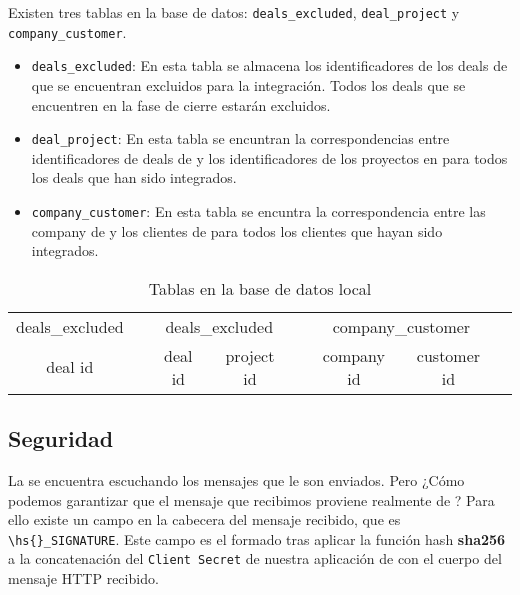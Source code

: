 \begin{itemize}[leftmargin=*]
 Existen tres tablas en la base de datos: \verb|deals_excluded|, \verb|deal_project| y \verb|company_customer|.
 
 
 \begin{itemize}
	\item \verb|deals_excluded|: En esta tabla se almacena los identificadores de los deals de \hs{} 
	que se encuentran excluidos para la integración. Todos los deals que se encuentren en la fase de
	cierre estarán excluidos.
	\item \verb|deal_project|: En esta tabla se encuntran la correspondencias entre identificadores 
	de deals de \hs{} y los identificadores de los proyectos en \wday{} para todos los deals que han sido integrados.
	\item \verb|company_customer|: En esta tabla se encuntra la correspondencia entre las company de \hs{} y los clientes de \wday{}
	para todos los clientes que hayan sido integrados.
 \end{itemize}
 
\begin{table}
		\centering
		\begin{tabular}{
		|c|c@{\hskip 1cm} 
		|c|c|c@{\hskip 1cm} 
		|c|c|c@{\hskip 1cm}
		}
		\cline{1-1}\cline{3-4}\cline{6-7}
		deals\_excluded && \multicolumn{2}{c|}{deals\_excluded} && \multicolumn{2}{c|}{company\_customer} \\
	\cline{1-1}\cline{3-4}\cline{6-7}
	deal id && deal id & project id && company id & customer id \\
	\cline{1-1}\cline{3-4}\cline{6-7}
	\end{tabular}
	\caption{Tablas en la base de datos local}
	\label{tab:tables}
\end{table}

\end{itemize}




\subsection{Seguridad}


La \iface{} se encuentra escuchando los mensajes que le son enviados. Pero ¿Cómo podemos garantizar que el mensaje que recibimos proviene realmente de \hs{}?
Para ello existe un campo en la cabecera del mensaje recibido, que es \verb|\hs{}_SIGNATURE|. 
Este campo es el formado tras aplicar la función hash \textbf{sha256} a la concatenación del \verb|Client Secret| de nuestra aplicación de \hs{} con el cuerpo del mensaje HTTP recibido.

